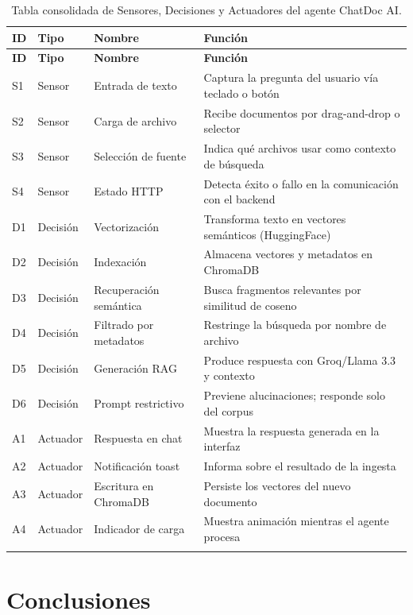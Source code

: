 \documentclass[12pt,a4paper]{article}
\begin{document}
\begin{longtable}{p{1.5cm} p{1.5cm} p{3.5cm} p{5.5cm}}
\toprule
\textbf{ID} & \textbf{Tipo} & \textbf{Nombre} & \textbf{Función} \\
\midrule
\endfirsthead
\toprule
\textbf{ID} & \textbf{Tipo} & \textbf{Nombre} & \textbf{Función} \\
\midrule
\endhead
S1 & Sensor & Entrada de texto & Captura la pregunta del usuario vía teclado o botón \\
S2 & Sensor & Carga de archivo & Recibe documentos por drag-and-drop o selector \\
S3 & Sensor & Selección de fuente & Indica qué archivos usar como contexto de búsqueda \\
S4 & Sensor & Estado HTTP & Detecta éxito o fallo en la comunicación con el backend \\
\midrule
D1 & Decisión & Vectorización & Transforma texto en vectores semánticos (HuggingFace) \\
D2 & Decisión & Indexación & Almacena vectores y metadatos en ChromaDB \\
D3 & Decisión & Recuperación semántica & Busca fragmentos relevantes por similitud de coseno \\
D4 & Decisión & Filtrado por metadatos & Restringe la búsqueda por nombre de archivo \\
D5 & Decisión & Generación RAG & Produce respuesta con Groq/Llama 3.3 y contexto \\
D6 & Decisión & Prompt restrictivo & Previene alucinaciones; responde solo del corpus \\
\midrule
A1 & Actuador & Respuesta en chat & Muestra la respuesta generada en la interfaz \\
A2 & Actuador & Notificación toast & Informa sobre el resultado de la ingesta \\
A3 & Actuador & Escritura en ChromaDB & Persiste los vectores del nuevo documento \\
A4 & Actuador & Indicador de carga & Muestra animación mientras el agente procesa \\
\bottomrule
\caption{Tabla consolidada de Sensores, Decisiones y Actuadores del agente ChatDoc AI.}
\label{tab:sda_final}
\end{longtable}

\section{Conclusiones}
\end{document}
